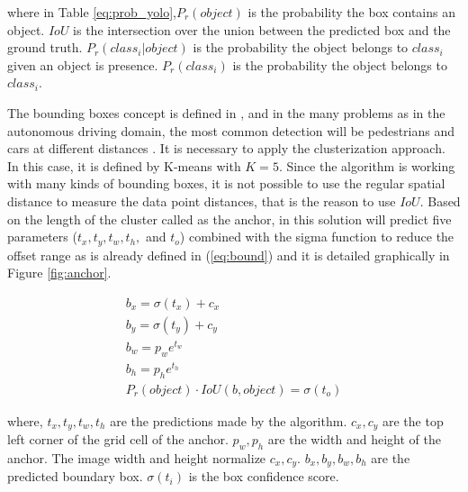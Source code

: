 where in Table \ref{eq:prob_yolo},$P_r(object)$ is the probability the box contains an object.
$IoU$ is the intersection over the union between the predicted box and the ground truth.
$P_r(class_i|object)$ is the probability the object belongs to $class_i$ given an object is presence.
$P_r(class_i)$ is the probability the object belongs to $class_i$.

The bounding boxes concept is defined in \cite{redmon2017yolo9000}, and in the many problems as in the autonomous driving domain, the most common detection will be pedestrians and cars at different distances \cite{ess2010object}.  It is necessary to apply the clusterization approach. In this case, it is defined by K-means with $K=5$. Since the algorithm is working with many kinds of bounding boxes, it is not possible to use the regular spatial distance to measure the data point distances, that is the reason to use $IoU$. Based on the length of the cluster called as the anchor, in this solution will predict five parameters ($t_x, t_y, t_w, t_h,$ and $t_o$) combined with the sigma function to reduce the offset range as is already defined in (\ref{eq:bound}) and it is detailed graphically in Figure \ref{fig:anchor}.


    
    \begin{equation}
    \label{eq:bound}
    \begin{aligned}
        b_x = \sigma(t_x) + c_x \\
        b_y = \sigma(t_y) + c_y \\
        b_w = p_we^{t_w} \\
        b_h = p_he^{t_h} \\
        P_r(object)\cdot IoU(b,object) = \sigma(t_o)
    \end{aligned}
    \end{equation}

where, $t_x, t_y, t_w, t_h$ are the predictions made by the algorithm. 
$c_x, c_y$ are the top left corner of the grid cell of the anchor.
$p_w, p_h$ are the width and height of the anchor. 
The image width and height normalize $ c_x, c_y$. 
$b_x, b_y, b_w, b_h$ are the predicted boundary box. 
$\sigma(t_i)$ is the box confidence score.

